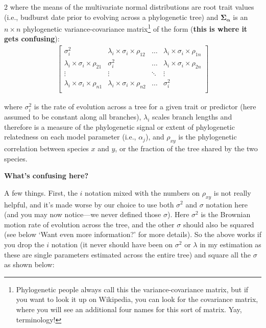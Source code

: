 \documentclass[10pt]{article}
\begin{document}
\begin{multicols}{2}
\noindent where the means of the multivariate normal distributions are root trait values (i.e., budburst date prior to evolving across a phylogenetic tree) and $\boldsymbol{\Sigma_{\alpha}}$ is an $n \times n$ phylogenetic variance-covariance matrix\footnote[2]{Phylogenetic people always call this the variance-covariance matrix, but if you want to look it up on Wikipedia, you can look for the covariance matrix, where you will see an additional four names for this sort of matrix. Yay, terminology!} of the form ({\bf this is where it gets confusing}): \\ 
\begin{align*}
  \label{phymatold}
\begin{bmatrix}
  \sigma^2_i & \lambda_i \times \sigma_{i} \times \rho_{12} & \ldots & \lambda_i \times \sigma_{i} \times \rho_{1n} \\
  \lambda_i \times \sigma_i \times \rho_{21} & \sigma^2_i & \ldots & \lambda_i \times \sigma_{i} \times \rho_{2n} \\
  \vdots & \vdots & \ddots & \vdots \\
  \lambda_i \times \sigma_i \times \rho_{n1} & \lambda_i \times \sigma_i \times \rho_{n2} & \ldots & \sigma^2_i \\
\end{bmatrix}
\end{align*}

\noindent where $\sigma_i^2$ is the rate of evolution across a tree for a given trait or predictor (here assumed to be constant along all branches), $\lambda_i$ scales branch lengths and therefore is a measure of the phylogenetic signal or extent of phylogenetic relatedness on each model parameter (i.e., $\alpha_{j}$), and $\rho_{xy}$ is the phylogenetic correlation between species $x$ and $y$, or the fraction of the tree shared by the two species.

{\bf What's confusing here?} 

A few things. First, the $i$ notation mixed with the numbers on $\rho_{xy}$ is not really helpful, and it's made worse by our choice to use both $\sigma^2$ and $\sigma$ notation here (and you may now notice---we never defined those  $\sigma$). Here $\sigma^2$ is the Brownian motion rate of evolution across the tree, and the other $\sigma$ should also be squared (see below `Want even more information?' for more details). So the above works if you drop the $i$ notation (it never should have been on  $\sigma^2$ or $\lambda$ in my estimation as these are single parameters estimated across the entire tree) and square all the $\sigma$ as shown below:


\end{multicols}
\end{document}
